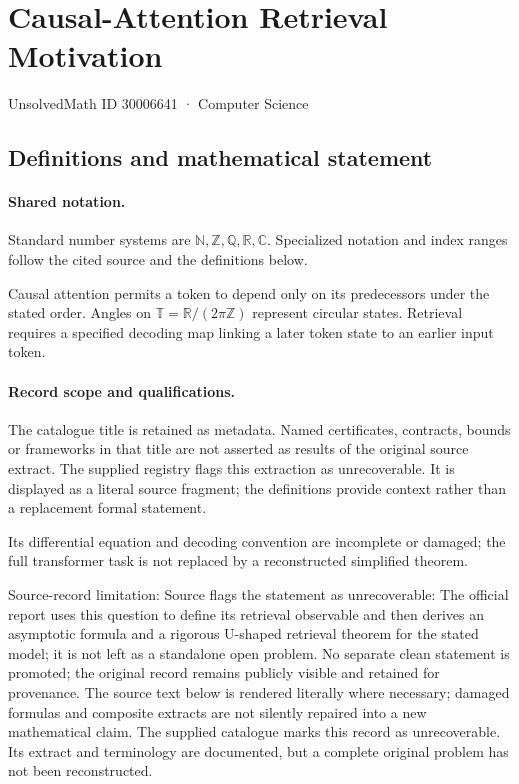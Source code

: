 \documentclass[11pt]{article}
\begin{document}
\setcounter{section}{30006640}
\section{Causal-Attention Retrieval Motivation}\label{30006641}
{\small\sffamily UnsolvedMath ID 30006641 · Computer Science}
\subsection{Definitions and mathematical statement}

\paragraph{Shared notation.}Standard number systems are $\mathbb N,\mathbb Z,\mathbb Q,\mathbb R,\mathbb C$. Specialized notation and index ranges follow the cited source and the definitions below.


Causal attention permits a token to depend only on its predecessors under the stated order. Angles on $\mathbb T=\mathbb R/(2\pi\mathbb Z)$ represent circular states. Retrieval requires a specified decoding map linking a later token state to an earlier input token.
\paragraph{Record scope and qualifications.}
The catalogue title is retained as metadata. Named certificates, contracts, bounds or frameworks in that title are not asserted as results of the original source extract.
The supplied registry flags this extraction as unrecoverable. It is displayed as a literal source fragment; the definitions provide context rather than a replacement formal statement.

Its differential equation and decoding convention are incomplete or damaged; the full transformer task is not replaced by a reconstructed simplified theorem.

Source-record limitation: Source flags the statement as unrecoverable: The official report uses this question to define its retrieval observable and then derives an asymptotic formula and a rigorous U-shaped retrieval theorem for the stated model; it is not left as a standalone open problem. No separate clean statement is promoted; the original record remains publicly visible and retained for provenance.
The source text below is rendered literally where necessary; damaged formulas and composite extracts are not silently repaired into a new mathematical claim.
The supplied catalogue marks this record as unrecoverable. Its extract and terminology are documented, but a complete original problem has not been reconstructed.
\end{document}
